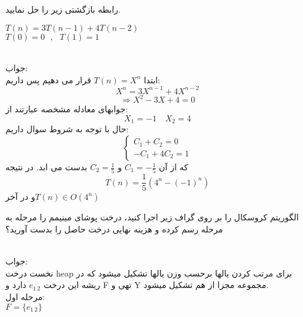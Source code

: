 \documentclass[12pt,a4paper]{exam}
\begin{document}
   \begin{questions}
    \question
رابطه بازگشتی زیر را حل نمایید.\\
\begin{flushleft}
$ T(n) = 3T(n-1)+4T(n-2)$  \\$T(0) = 0  \ \ \ ,\ \ \ T(1)=1$
\end{flushleft}
\\
جواب:\\
ابتدا $T(n)=X^n$ قرار می دهیم پس داریم:\\
$$X^n=3X^{n-1}+4X^{n-2}$$
$$\Rightarrow X^2-3X+4=0$$
جوابهای معادله مشخصه عبارتند از: \\
$$X_{1}=-1 \quad X_{2}=4$$
حال با توجه به شروط سوال داریم:\\
$$\begin{cases} C_{1}+C_{2}=0 \\ -C_{1}+4C_{2}=1 \end{cases}$$
که از آن $C_{1}=-\frac{1}{5}$ و  $C_{2}=\frac{1}{5}$  بدست می ابد. در نتیجه\\
$$T(n)=\frac{1}{5}(4^n-(-1)^n)$$
و در آخر$T(n) \in O(4^n)$

    \question

الگوریتم کروسکال را بر روی گراف زیر اجرا کنید، درخت پوشای مینیمم را مرحله به مرحله رسم کرده و هزینه نهایی درخت حاصل را بدست آورید؟\\
\\
جواب:\\
نخست درخت heap برای مرتب کردن یالها برحسب وزن یالها تشکیل میشود که در ریشه این درخت $e_{1\ 2}$  دارد و F تهی و Y مجموعه مجزا از هم تشکیل میشود.\\
مرحله اول:\\
$F=\{e_{1\ 2}\}$ \\
\end{questions}
\end{document}
